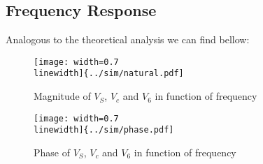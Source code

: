 \subsection{Frequency Response}

Analogous to the theoretical analysis we can find bellow:

\begin{figure}[!h]
	\centering
	\texttt{[image: width=0.7\\linewidth]\{../sim/natural.pdf]}
	\caption{Magnitude of $V_S$, $V_c$ and $V_6$ in function of frequency}
\end{figure}

\begin{figure}[!h]
	\centering
	\texttt{[image: width=0.7\\linewidth]\{../sim/phase.pdf]}
	\caption{Phase of $V_S$, $V_c$ and $V_6$ in function of frequency}
\end{figure}